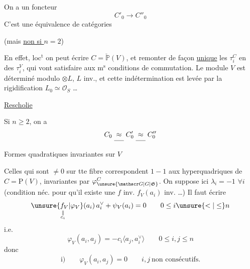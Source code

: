 On a un foncteur
\[
C'_0\longrightarrow C''_0
\]
C'est une équivalence de catégories 

(mais \uline{non si $n=2$})

En effet, loc$^{\mathrm t}$ on peut écrire $C=\check{\mathbb P}(V)$, et remonter de façon \uline{unique} les  $\tau_i^C$ en des  $\tau_i^V$, qui vont satisfaire aux m$^{\mathrm s}$ conditions de commutation.  Le module $V$ est déterminé modulo $\otimes L$, $L$ inv., et cette indétermination est levée par la rigidification $L_0\simeq\mathcal O_S$ \ldots

 \uline{Rescholie}

 Si $n\geq2$, on a 
\[
C_0\mathrel{\underset{\rule{1.4em}{.35pt}}{\approx}}C'_0\mathrel{\underset{\rule{1.4em}{.35pt}}{\approx}}C''_0
\]

Formes quadratiques  invariantes sur $V$

  Celles qui sont $\ne0$ sur tte fibre correspondent $1-1$ aux hyperquadriques  de $C=\mathrm P(V)$, invariantes par $\varphi_{\unsure{\mathscr G|G|\mathfrak G}}^C$. On suppose ici \uline{$\lambda_i=-1$} $\forall i$  %
(condition néc. pour qu'il existe une $f$  inv.  $f_V(a_i)$ inv. \ldots) Il faut écrire
\[
\underset{\substack{\|\\c_i}}{\unsure{f_V|\varphi_V}(a_i)}\,a_i^\vee+\psi_V(a_i)=0\qquad 0\leq i\unsure{<|\leq}n
\]
i.e.
\[
\varphi_V(a_i,a_j)=-c_i\langle a_j,a_i^\vee\rangle\qquad 0\leq i,j\leq n
\]
donc
\[
\text{i)}\qquad\varphi_V(a_i,a_j)=0\qquad i,j\ \text{non consécutifs.}
\]

